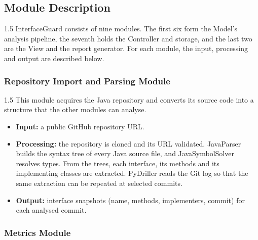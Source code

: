 \documentclass[12pt,a4paper]{article}
\begin{document}
\subsection{Module Description}
 
\begin{spacing}{1.5}
\justifying
InterfaceGuard consists of nine modules. The first six form the Model's
analysis pipeline, the seventh holds the Controller and storage, and the last
two are the View and the report generator. For each module, the input,
processing and output are described below.
\end{spacing}
 
\subsubsection{Repository Import and Parsing Module}
 
\begin{spacing}{1.5}
\justifying
This module acquires the Java repository and converts its source code into a structure that the other modules can analyse.
 
\begin{itemize}[leftmargin=*,itemsep=2pt]
  \item \textbf{Input:} a public GitHub repository URL.
  \item \textbf{Processing:} the repository is cloned and its URL validated. JavaParser builds the syntax tree of every Java source file, and JavaSymbolSolver resolves types. From the trees, each interface, its methods and its implementing classes are extracted. PyDriller reads the Git log so that the same extraction can be repeated at selected commits.
  \item \textbf{Output:} interface snapshots (name, methods, implementers, commit) for each analysed commit.
\end{itemize}
\end{spacing}
 
\subsubsection{Metrics Module}
 
\end{document}
